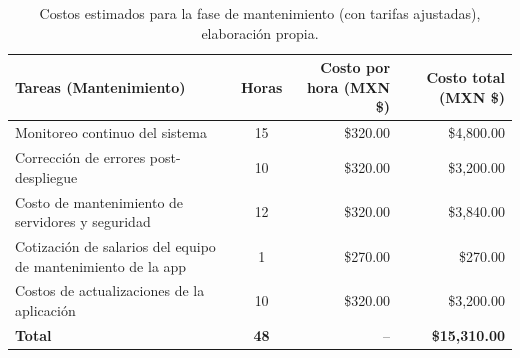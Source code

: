 \begin{table}[H]
	\centering
	\renewcommand{\arraystretch}{1.6}
	\setlength{\tabcolsep}{10pt}
	\Huge
	\begin{adjustbox}{max width=\textwidth}
		\begin{tabular}{|p{9.5cm}|c|r|r|}
			\hline
			\textbf{Tareas (Mantenimiento)} & \textbf{Horas} & \textbf{Costo por hora (MXN \$)} & \textbf{Costo total (MXN \$)} \\ \hline
			Monitoreo continuo del sistema & 15 & \$320.00 & \$4,800.00 \\ \hline
			Corrección de errores post-despliegue & 10 & \$320.00 & \$3,200.00 \\ \hline
			Costo de mantenimiento de servidores y seguridad & 12 & \$320.00 & \$3,840.00 \\ \hline
			Cotización de salarios del equipo de mantenimiento de la app & 1 & \$270.00 & \$270.00 \\ \hline
			Costos de actualizaciones de la aplicación & 10 & \$320.00 & \$3,200.00 \\ \hline
			\textbf{Total} & \textbf{48} & -- & \textbf{\$15,310.00} \\ \hline
		\end{tabular}
	\end{adjustbox}
	\caption[Costos estimados para la fase de mantenimiento (con tarifas ajustadas)]{Costos estimados para la fase de mantenimiento (con tarifas ajustadas), elaboración propia.} 
	\label{tab:costos_mantenimiento}
\end{table}

